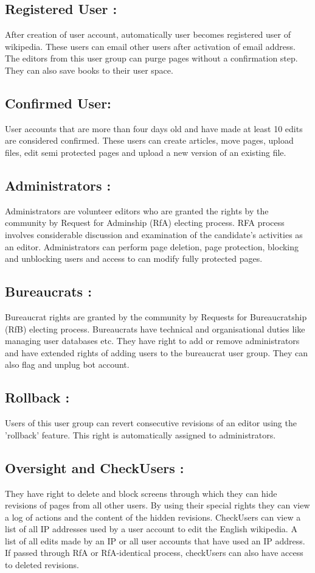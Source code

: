 \documentclass[12pt]{article}
\begin{document}
\subsection*{Registered User :}
After creation of  user account, automatically user becomes registered user of wikipedia. These users can email other users after activation of email address. The editors from this user group can purge pages without a confirmation step. They can also save books to their user space.
\subsection*{Confirmed User:}
User accounts that are more than four days old and have made at least 10 edits are considered confirmed. These users can create articles, move pages, upload files, edit semi protected pages and upload a new version of an existing file.
\subsection*{Administrators : }
Administrators are volunteer editors who are granted the rights by the community by Request for Adminship (RfA) electing process. RFA process involves considerable discussion and examination of the candidate's activities as an editor. Administrators can perform page deletion, page protection, blocking and unblocking users and access to can modify fully protected pages.
\subsection*{Bureaucrats :}
Bureaucrat rights are granted by the community by Requests for Bureaucratship (RfB) electing process. Bureaucrats have technical and organisational duties like managing user databases etc. They have right to add or remove administrators and have extended rights of adding users to the bureaucrat user group. They can also flag and unplug bot account.
\subsection*{Rollback : }
Users of this user group can revert consecutive revisions of an editor using the 'rollback' feature. This right is automatically assigned to administrators.
\subsection*{Oversight and CheckUsers :}
They have right to delete and block screens through which they can hide revisions of pages from all other users. By using their special rights they can view a log of actions and the content of the hidden revisions. CheckUsers can view a list of all IP addresses used by a user account to edit the English wikipedia. A list of all edits made by an IP or all user accounts that have used an IP address. If passed through RfA or RfA-identical process, checkUsers can also have access to deleted revisions.
\end{document}
